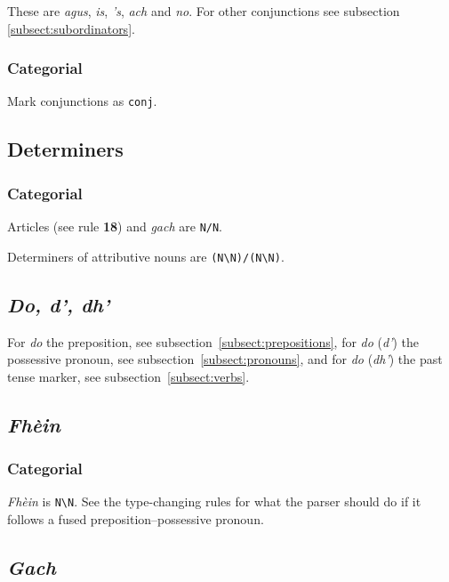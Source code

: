 \documentclass[a4paper]{article}
\begin{document}
These are \textit{agus}, \textit{is}, \textit{'s}, \textit{ach} and \textit{no}.
For other conjunctions see subsection \ref{subsect:subordinators}.

\subsubsection*{Categorial}

 Mark conjunctions as \texttt{conj}. 

\subsection{Determiners\label{subsect:determiners}}

\subsubsection*{Categorial}

 Articles (see rule {\bf 18}) and \textit{gach} are \texttt{N/N}.

 Determiners of attributive nouns are \texttt{(N\textbackslash N)/(N\textbackslash N)}.

\subsection{\textit{Do, d', dh'}\label{subsect:do}}

For \textit{do} the preposition, see subsection~\ref{subsect:prepositions},
for \textit{do} (\textit{d'}) the possessive pronoun, see subsection~\ref{subsect:pronouns}, and
for \textit{do} (\textit{dh'}) the past tense marker, see subsection~\ref{subsect:verbs}.

\subsection{\textit{Fh\`ein}\label{subsect:fhein}}

\subsubsection*{Categorial}
 \textit{Fh\`ein} is \texttt{N\textbackslash N}.
See the type-changing rules for what the parser should do if it follows a fused preposition--possessive pronoun.

\subsection{\textit{Gach}\label{subsect:gach}}
\end{document}
